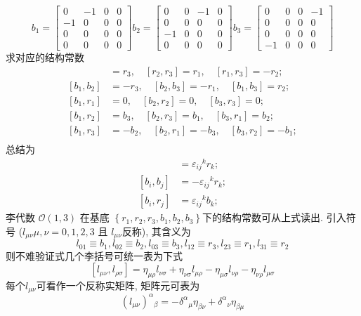 \documentclass[../main.tex]{subfiles}
\begin{document}
 $$b_1=\begin{bmatrix}
	0  & -1 & 0 & 0 \\
	-1 & 0  & 0 & 0 \\
	0  & 0  & 0 & 0 \\
	0  & 0  & 0 & 0
\end{bmatrix}
b_2=\begin{bmatrix}
	0  & 0 & -1 & 0 \\
	0  & 0 & 0  & 0 \\
	-1 & 0 & 0  & 0 \\
	0  & 0 & 0  & 0
\end{bmatrix}
b_3=\begin{bmatrix}
	0  & 0 & 0 & -1 \\
	0  & 0 & 0 & 0  \\
	0  & 0 & 0 & 0  \\
	-1 & 0 & 0 & 0
\end{bmatrix}$$
  求对应的结构常数
  \begin{align*}
      [r_1,r_2] &= r_3,\quad
      [r_2,r_3] = r_1,\quad
      [r_1,r_3] = -r_2; \\
      [b_1,b_2] &= -r_3,\quad
      [b_2,b_3] = -r_1,\quad
      [b_1,b_3] = r_2;\\
      [b_1,r_1] &= 0,\quad
      [b_2,r_2] = 0,\quad
      [b_3,r_3] = 0 ;\\
      [b_1,r_2] &= b_3,\quad
      [b_2,r_3] = b_1 ,\quad
      [b_3,r_1] = b_2;\\    
      [b_1,r_3] &= -b_2,\quad
      [b_2,r_1] = -b_3,\quad
      [b_3,r_2] = -b_1;\\
  \end{align*}  
  总结为
  \begin{align*}
      [r_i,r_j] &= \varepsilon_{ij}{}^{k}r_k;\\
      [b_i,b_j] &= -\varepsilon_{ij}{}^{k}r_k;\\
      [b_i,r_j] &= \varepsilon_{ij}{}^{k}b_k;
  \end{align*} 
  李代数 $\mathscr{O}(1,3)$ 在基底 $\left\{r_{1}, r_{2}, r_{3}, b_{1}, b_{2}, b_{3}\right\} $下的结构常数可从上式读出.
  引入符号 ($l_{\mu \nu}\mu, \nu=0,1,2,3$ 且 $l_{\mu \nu}$反称), 其含义为
  $$l_{01} \equiv b_{1}, l_{02} \equiv b_{2}, l_{03} \equiv b_{3}, l_{12} \equiv r_{3}, l_{23} \equiv r_{1}, l_{31} \equiv r_{2}$$
  则不难验证式几个李括号可统一表为下式
  $$\left[l_{\mu \nu}, l_{\rho \sigma}\right]=\eta_{\mu \rho} l_{\nu \sigma}+\eta_{\nu \sigma} l_{\mu \rho}-\eta_{\mu \sigma} l_{\nu \rho}-\eta_{\nu \rho} l_{\mu \sigma}$$
  每个$l_{\mu \nu}$可看作一个反称实矩阵, 矩阵元可表为$$\left(l_{\mu \nu}\right)^{\alpha}{ }_{\beta}=-\delta^{\alpha}{ }_{\mu} \eta_{\beta \nu}+\delta^{\alpha}{ }_{\nu} \eta_{\beta \mu}$$
\end{document}

